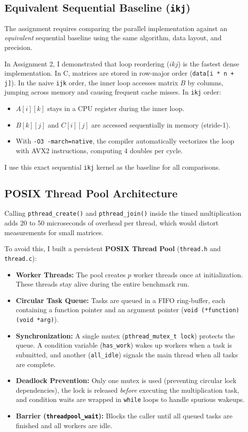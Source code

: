 \documentclass[11pt,a4paper]{article}
\begin{document}
\subsection{Equivalent Sequential Baseline (\texttt{ikj})}
The assignment requires comparing the parallel implementation against an \textit{equivalent} sequential baseline using the same algorithm, data layout, and precision.

In Assignment 2, I demonstrated that loop reordering ($ikj$) is the fastest dense implementation. In C, matrices are stored in row-major order (\texttt{data[i * n + j]}). In the naive \texttt{ijk} order, the inner loop accesses matrix $B$ by columns, jumping across memory and causing frequent cache misses. In \texttt{ikj} order:
\begin{itemize}
    \item $A[i][k]$ stays in a CPU register during the inner loop.
    \item $B[k][j]$ and $C[i][j]$ are accessed sequentially in memory (stride-1).
    \item With \texttt{-O3 -march=native}, the compiler automatically vectorizes the loop with AVX2 instructions, computing 4 doubles per cycle.
\end{itemize}
I use this exact sequential \texttt{ikj} kernel as the baseline for all comparisons.

\subsection{POSIX Thread Pool Architecture}
Calling \texttt{pthread\_create()} and \texttt{pthread\_join()} inside the timed multiplication adds 20 to 50 microseconds of overhead per thread, which would distort measurements for small matrices.

To avoid this, I built a persistent \textbf{POSIX Thread Pool} (\texttt{thread.h} and \texttt{thread.c}):
\begin{itemize}
    \item \textbf{Worker Threads:} The pool creates $p$ worker threads once at initialization. These threads stay alive during the entire benchmark run.
    \item \textbf{Circular Task Queue:} Tasks are queued in a FIFO ring-buffer, each containing a function pointer and an argument pointer (\texttt{void (*function)(void *arg)}).
    \item \textbf{Synchronization:} A single mutex (\texttt{pthread\_mutex\_t lock}) protects the queue. A condition variable (\texttt{has\_work}) wakes up workers when a task is submitted, and another (\texttt{all\_idle}) signals the main thread when all tasks are complete.
    \item \textbf{Deadlock Prevention:} Only one mutex is used (preventing circular lock dependencies), the lock is released \textit{before} executing the multiplication task, and condition waits are wrapped in \texttt{while} loops to handle spurious wakeups.
    \item \textbf{Barrier (\texttt{threadpool\_wait}):} Blocks the caller until all queued tasks are finished and all workers are idle.
\end{itemize}
\end{document}
